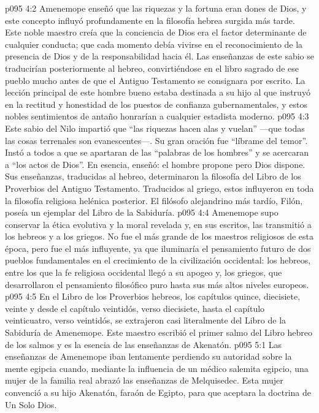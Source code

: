 \vs p095 4:2 Amenemope enseñó que las riquezas y la fortuna eran dones de Dios, y este concepto influyó profundamente en la filosofía hebrea surgida más tarde. Este noble maestro creía que la conciencia de Dios era el factor determinante de cualquier conducta; que cada momento debía vivirse en el reconocimiento de la presencia de Dios y de la responsabilidad hacia él. Las enseñanzas de este sabio se traducirían posteriormente al hebreo, convirtiéndose en el libro sagrado de ese pueblo mucho antes de que el Antiguo Testamento se consignara por escrito. La lección principal de este hombre bueno estaba destinada a su hijo al que instruyó en la rectitud y honestidad de los puestos de confianza gubernamentales, y estos nobles sentimientos de antaño honrarían a cualquier estadista moderno.
\vs p095 4:3 Este sabio del Nilo impartió que “las riquezas hacen alas y vuelan” ---que todas las cosas terrenales son evanescentes---. Su gran oración fue “líbrame del temor”. Instó a todos a que se apartaran de las “palabras de los hombres” y se acercaran a “los actos de Dios”. En esencia, enseñó: el hombre propone pero Dios dispone. Sus enseñanzas, traducidas al hebreo, determinaron la filosofía del Libro de los Proverbios del Antiguo Testamento. Traducidos al griego, estos influyeron en toda la filosofía religiosa helénica posterior. El filósofo alejandrino más tardío, Filón, poseía un ejemplar del Libro de la Sabiduría.
\vs p095 4:4 Amenemope supo conservar la ética evolutiva y la moral revelada y, en sus escritos, las transmitió a los hebreos y a los griegos. No fue el más grande de los maestros religiosos de esta época, pero fue el más influyente, ya que iluminaría el pensamiento futuro de dos pueblos fundamentales en el crecimiento de la civilización occidental: los hebreos, entre los que la fe religiosa occidental llegó a su apogeo y, los griegos, que desarrollaron el pensamiento filosófico puro hasta sus más altos niveles europeos.
\vs p095 4:5 \pc En el Libro de los Proverbios hebreos, los capítulos quince, diecisiete, veinte y desde el capítulo veintidós, verso diecisiete, hasta el capítulo veinticuatro, verso veintidós, se extrajeron casi literalmente del Libro de la Sabiduría de Amenemope. Este maestro escribió el primer salmo del Libro hebreo de los salmos y es la esencia de las enseñanzas de Akenatón.
\vs p095 5:1 Las enseñanzas de Amenemope iban lentamente perdiendo su autoridad sobre la mente egipcia cuando, mediante la influencia de un médico salemita egipcio, una mujer de la familia real abrazó las enseñanzas de Melquisedec. Esta mujer convenció a su hijo Akenatón, faraón de Egipto, para que aceptara la doctrina de Un Solo Dios.
